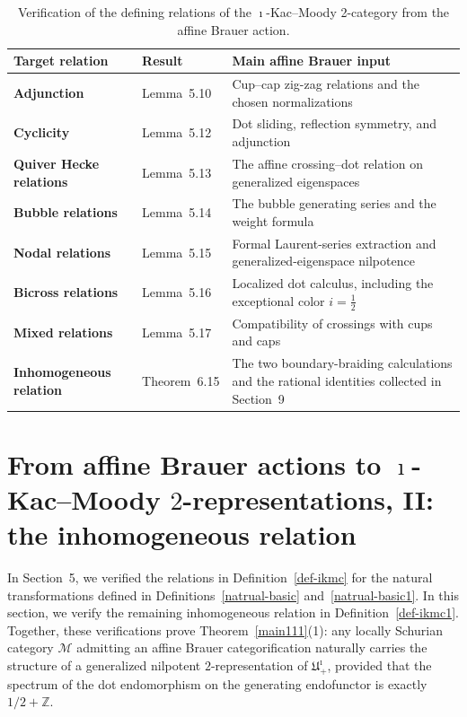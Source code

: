 \documentclass[a4,10pt]{amsart}
\def\arraystretch{1.2} %
\numberwithin{equation}{section}
\theoremstyle{definition}
\begin{document}
\begin{table}[!htbp]
  \centering
  \small
  \setlength{\tabcolsep}{4pt}
  \renewcommand{\arraystretch}{1.16}
  \caption{Verification of the defining relations of the $\imath$-Kac--Moody
  2-category from the affine Brauer action.}
  \label{tab:relation-verification}
  \begin{tabularx}{\textwidth}{@{}>{\bfseries}p{}p{}Y@{}}
    \toprule
    Target relation & Result & Main affine Brauer input \\
    \midrule
    Adjunction
      & Lemma~5.10
      & Cup--cap zig-zag relations and the chosen normalizations \\
    Cyclicity
      & Lemma~5.12
      & Dot sliding, reflection symmetry, and adjunction \\
    Quiver Hecke relations
      & Lemma~5.13
      & The affine crossing--dot relation on generalized eigenspaces \\
    Bubble relations
      & Lemma~5.14
      & The bubble generating series and the weight formula \\
    Nodal relations
      & Lemma~5.15
      & Formal Laurent-series extraction and generalized-eigenspace nilpotence \\
    Bicross relations
      & Lemma~5.16
      & Localized dot calculus, including the exceptional color $i=\tfrac12$ \\
    Mixed relations
      & Lemma~5.17
      & Compatibility of crossings with cups and caps \\
    Inhomogeneous relation
      & Theorem~6.15
      & The two boundary-braiding calculations and the rational identities
        collected in Section~9 \\
    \bottomrule
  \end{tabularx}
\end{table}
\FloatBarrier


\section{From affine Brauer actions to $\imath$-Kac--Moody $2$-representations, II:   the inhomogeneous relation} \label{diliu}
In  Section~5, we verified  the relations in Definition~\ref{def-ikmc} for  the natural transformations defined in
Definitions~\ref{natrual-basic} and~\ref{natrual-basic1}. In this section, we verify the remaining  inhomogeneous relation in Definition~\ref{def-ikmc1}. Together, these verifications  prove 
 Theorem~\ref{main111}(1):
any locally Schurian category \(\mathcal M\) admitting an affine Brauer
categorification naturally carries the structure of a generalized nilpotent
\(2\)-representation of \(\mathfrak U_+^\imath\), provided that the spectrum of the  dot endomorphism on the  
 generating endofunctor is exactly 
\(1/2+\mathbb Z\).
\end{document}

